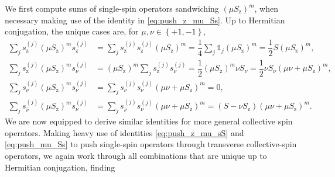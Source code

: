 \documentclass[pra,reprint,longbibliography]{revtex4-1}
\newcommand{\f}[2]{\dfrac{#1}{#2}} %
\newcommand{\p}[1]{\left(#1\right)} %
\renewcommand{\set}[1]{\left\{#1\right\}} %
\newcommand{\z}{\text{z}}
\newcommand{\bnu}{{\bar\nu}}
\newcommand{\1}{\mathds{1}}
\begin{document}
We first compute sums of single-spin operators sandwiching
$\p{\mu S_\z}^m$, when necessary making use of the identity in
\eqref{eq:push_z_mu_Ss}.  Up to Hermitian conjugation, the unique
cases are, for $\mu,\nu\in\set{+1,-1}$,
\begin{align}
  \sum_j s_\z^{(j)} \p{\mu S_\z}^m s_\z^{(j)}
  &= \sum_j s_\z^{(j)} s_\z^{(j)} \p{\mu S_\z}^m
  = \f14 \sum_j \1_j \p{\mu S_\z}^m
  = \f12 S \p{\mu S_\z}^m, \\
  \sum_j s_\z^{(j)} \p{\mu S_\z}^m s_\nu^{(j)}
  &= \p{\mu S_\z}^m \sum_j s_\z^{(j)} s_\nu^{(j)}
  = \f12 \p{\mu S_\z}^m \nu S_\nu
  = \f12 \nu S_\nu \p{\mu\nu+\mu S_\z}^m, \\
  \sum_j s_\nu^{(j)} \p{\mu S_\z}^m s_\nu^{(j)}
  &= \sum_j s_\nu^{(j)} s_\nu^{(j)} \p{\mu\nu+\mu S_\z}^m
  = 0, \\
  \sum_j s_\bnu^{(j)} \p{\mu S_\z}^m s_\nu^{(j)}
  &= \sum_j s_\bnu^{(j)} s_\nu^{(j)} \p{\mu\nu+\mu S_\z}^m
  = \p{S-\nu S_\z} \p{\mu\nu+\mu S_\z}^m.
\end{align}
We are now equipped to derive similar identities for more general
collective spin operators.  Making heavy use of identities
\eqref{eq:push_z_mu_sS} and \eqref{eq:push_mu_Ss} to push single-spin
operators through transverse collective-spin operators, we again work
through all combinations that are unique up to Hermitian conjugation,
finding
\end{document}
